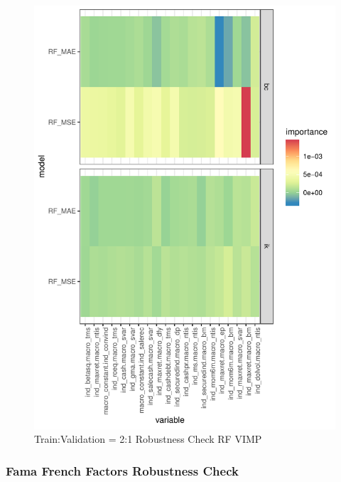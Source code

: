 \documentclass[11pt, a4paper, table]{article}
\begin{document}
\begin{figure}
	\includegraphics[]{../Results/empirical_train_valid_2/empirical_vimp.pdf}
	\caption{Train:Validation = 2:1 Robustness Check RF VIMP}
\end{figure}

\FloatBarrier
\subsubsection{Fama French Factors Robustness Check}





\FloatBarrier

\end{document}
